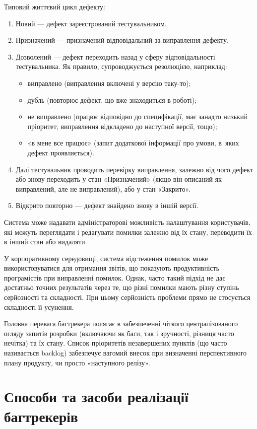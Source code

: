 \documentclass[../main.tex]{subfiles}
\begin{document}
Типовий життєвий цикл дефекту:
\begin{enumerate}
	\item Новий — дефект зареєстрований тестувальником.
	\item Призначений — призначений відповідальний за виправлення дефекту.
	\item Дозволений — дефект переходить назад у сферу відповідальності тестувальника. Як правило, супроводжується резолюцією, наприклад:
	\begin{itemize}
		\item виправлено (виправлення включені у версію таку-то);
		\item дубль (повторює дефект, що вже знаходиться в роботі);
		\item не виправлено (працює відповідно до специфікації, має занадто низький пріоритет, виправлення відкладено до наступної версії, тощо);
		\item «в мене все працює» (запит додаткової інформації про умови, в~яких дефект проявляється).
	\end{itemize}
	\item Далі тестувальник проводить перевірку виправлення, залежно від чого дефект або знову переходить у стан «Призначений» (якщо він описаний як виправлений, але не виправлений), або у стан «Закрито».
	\item Відкрито повторно — дефект знайдено знову в іншій версії.
\end{enumerate}
Система може надавати адміністраторові можливість налаштування користувачів, які можуть переглядати і редагувати помилки залежно від їх стану, переводити їх в інший стан або видаляти.

У корпоративному середовищі, система відстеження помилок може використовуватися для отримання звітів, що показують продуктивність програмістів при виправленні помилок. Однак, часто такий підхід не дає достатньо точних результатів через те, що різні помилки мають різну ступінь серйозності та складності. При цьому серйозність проблеми прямо не стосується складності її усунення.

Головна перевага багтрекера полягає в забезпеченні чіткого централізованого огляду запитів розробки (включаючи як баги, так і зручності, різниця часто нечітка) та їх стану. Список пріоритетів незавершених пунктів (що часто називається backlog) забезпечує вагомий внесок при визначенні перспективного плану продукту, чи просто «наступного релізу».

\section{Способи та засоби реалізації багтрекерів}
\end{document}
